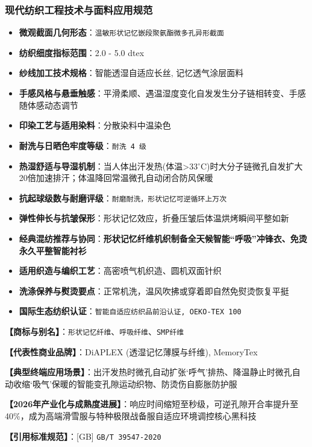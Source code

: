 \documentclass[11pt,openright,twoside,UTF8]{ctexbook}
\begin{document}
\subsubsection*{现代纺织工程技术与面料应用规范}
\begin{itemize} \setlength{\itemsep}{2pt}
    \item \textbf{微观截面几何形态}：\texttt{温敏形状记忆嵌段聚氨酯微多孔异形截面}
    \item \textbf{纺织细度指标范围}：2.0 - 5.0 dtex
    \item \textbf{纱线加工技术规格}：智能透湿自适应长丝, 记忆透气涂层面料
    \item \textbf{手感风格与悬垂触感}：平滑柔顺、遇温湿度变化自发发生分子链相转变、手感随体感动态调节
    \item \textbf{印染工艺与适用染料}：分散染料中温染色
    \item \textbf{耐洗与日晒色牢度等级}：\texttt{耐洗 4 级}
    \item \textbf{热湿舒适与导湿机制}：当人体出汗发热(体温\textgreater{}33$^\circ\mathrm{C}$)时大分子链微孔自发扩大20倍加速排汗；体温降回常温微孔自动闭合防风保暖
    \item \textbf{抗起球级数与耐磨评级}：\texttt{耐磨耐洗，形状记忆可逆循环上万次}
    \item \textbf{弹性伸长与抗皱保形}：形状记忆效应，折叠压皱后体温烘烤瞬间平整如新
    \item \textbf{经典混纺推荐与协同}：\textbf{形状记忆纤维机织制备全天候智能“呼吸”冲锋衣、免烫永久平整智能衬衫}
    \item \textbf{适用织造与编织工艺}：高密喷气机织造、圆机双面针织
    \item \textbf{洗涤保养与熨烫要点}：正常机洗，温风吹拂或穿着即自然免熨烫恢复平挺
    \item \textbf{国际生态纺织认证}：\texttt{智能自适应纺织品前沿认证, OEKO-TEX 100}
\end{itemize}
\vspace{0.2cm}

\noindent\textbf{【商标与别名】}：\texttt{形状记忆纤维}、\texttt{呼吸纤维}、\texttt{SMP纤维}\par
\noindent\textbf{【代表性商业品牌】}：DiAPLEX (透湿记忆薄膜与纤维), MemoryTex\par
\noindent\textbf{【典型终端应用场景】}：出汗发热时微孔自动扩张‘呼气’排热、降温静止时微孔自动收缩‘吸气’保暖的智能变孔隙运动织物、防烫伤自膨胀防护服\par
\noindent\textbf{【2026年产业化与成熟度进展】}：响应时间缩短至秒级，可逆孔隙开合率提升至40\%，成为高端滑雪服与特种极限战备服自适应环境调控核心黑科技\par
\noindent\textbf{【引用标准规范】}：[GB] \texttt{GB/T 39547-2020}\par
\vspace{0.5cm}
\end{document}
